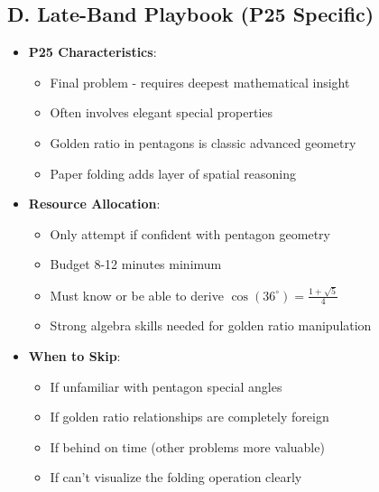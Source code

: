 \documentclass[12pt]{article}
\begin{document}
\begin{strategicbox}
\subsection*{D. Late-Band Playbook (P25 Specific)}
\begin{itemize}[leftmargin=*]
    \item \textbf{P25 Characteristics}: 
    \begin{itemize}
        \item Final problem - requires deepest mathematical insight
        \item Often involves elegant special properties
        \item Golden ratio in pentagons is classic advanced geometry
        \item Paper folding adds layer of spatial reasoning
    \end{itemize}
    \item \textbf{Resource Allocation}: 
    \begin{itemize}
        \item Only attempt if confident with pentagon geometry
        \item Budget 8-12 minutes minimum
        \item Must know or be able to derive $\cos(36^\circ) = \frac{1+\sqrt{5}}{4}$
        \item Strong algebra skills needed for golden ratio manipulation
    \end{itemize}
    \item \textbf{When to Skip}: 
    \begin{itemize}
        \item If unfamiliar with pentagon special angles
        \item If golden ratio relationships are completely foreign
        \item If behind on time (other problems more valuable)
        \item If can't visualize the folding operation clearly
    \end{itemize}
\end{itemize}
\end{strategicbox}
\end{document}
